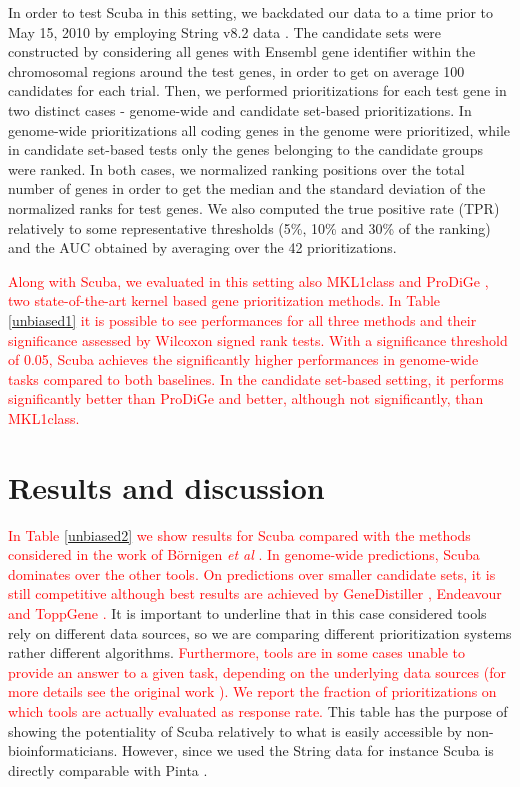 In order to test Scuba in this setting, we backdated our data to a time prior to May 15, 2010 by employing String v8.2 data \cite{string}. The candidate sets were constructed by considering all genes with Ensembl \cite{ensembl} gene identifier within the chromosomal regions around the test genes, in order to get on average 100 candidates for each trial. Then, we performed prioritizations for each test gene in two distinct cases - genome-wide and candidate set-based prioritizations. In genome-wide prioritizations all coding genes in the genome were prioritized, while in candidate set-based tests only the genes belonging to the candidate groups were ranked. In both cases, we normalized ranking positions over the total number of genes in order to get the median and the standard deviation of the normalized ranks for test genes. We also computed the true positive rate (TPR) relatively to some representative thresholds (5\%, 10\% and 30\% of the ranking) and the AUC obtained by averaging over the 42 prioritizations.

\textcolor{red}{Along with Scuba, we evaluated in this setting also MKL1class \cite{mkl1class} and ProDiGe \cite{prodige}, two state-of-the-art kernel based gene prioritization methods.  In Table \ref{unbiased1} it is possible to see performances for all three methods and their significance assessed by Wilcoxon signed rank tests. With a significance threshold of 0.05, Scuba achieves the significantly higher performances in genome-wide tasks compared to both baselines. In the candidate set-based setting, it performs significantly better than ProDiGe and better, although not significantly, than MKL1class.}

\section{Results and discussion}
\textcolor{red}{In Table \ref{unbiased2} we show results for Scuba compared with the methods considered in the work of B\"{o}rnigen \emph{et al} \cite{bornigen}. In genome-wide predictions, Scuba dominates over the other tools. On predictions over smaller candidate sets, it is still competitive although best results are achieved by GeneDistiller \cite{genedistiller}, Endeavour \cite{endeavour} and ToppGene \cite{toppgene}.} It is important to underline that in this case considered tools rely on different data sources, so we are comparing different prioritization systems rather different algorithms. \textcolor{red}{Furthermore, tools are in some cases unable to provide an answer to a given task, depending on the underlying data sources (for more details see the original work \cite{bornigen}). We report the fraction of prioritizations on which tools are actually evaluated as response rate.} This table has the purpose of showing the potentiality of Scuba relatively to what is easily accessible by non-bioinformaticians. However, since we used the String data for instance Scuba is directly comparable with Pinta \cite{pinta}.

